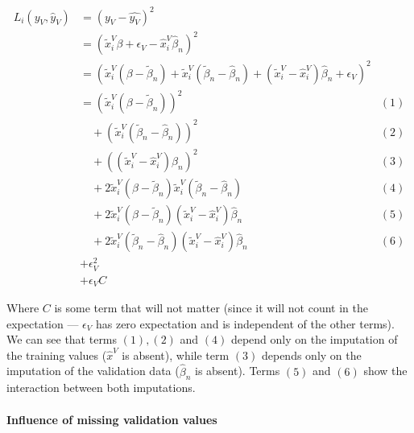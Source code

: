 \begin{align*}
L_i(y_V, \hat{y}_V) &= (y_V - \hat{y_V})^2 &\\
				&= (\tilde{x}_i^V \beta + \epsilon_V - \hat{x}_i^V \hat{\beta}_n)^2 &\\
				   &= (\tilde{x}_i^V(\beta - \tilde{\beta}_n) + \tilde{x}_i^V (\tilde{\beta}_n - \hat{\beta}_n) + (\tilde{x}_i^V - \hat{x}_i^V) \hat{\beta}_n + \epsilon_V)^2 & \\
				   &= (\tilde{x}_i^V (\beta - \tilde{\beta}_n))^2 & (1) \\
				   & \quad + (\tilde{x}_i^V (\tilde{\beta}_n-\hat{\beta}_n))^2 &(2) \\
				   & \quad + ((\tilde{x}_i^V - \hat{x}_i^V) \hat{\beta}_n)^2 &(3) \\
				   & \quad +2 \tilde{x}_i^V (\beta - \tilde{\beta}_n) \tilde{x}_i^V (\tilde{\beta}_n - \hat{\beta}_n) & (4) \\
				   & \quad +2 \tilde{x}_i^V (\beta - \tilde{\beta}_n) (\tilde{x}_i^V - \hat{x}_i^V )\hat{\beta}_n & (5) \\
				   & \quad +2 \tilde{x}_i^V (\tilde{\beta}_n - \hat{\beta}_n) (\tilde{x}_i^V - \hat{x}_i^V) \hat{\beta}_n & (6)\\
				   & + \epsilon_V^2 &\\
				   & + \epsilon_V C
\end{align*}

Where $C$ is some term that will not matter (since it will not count in the expectation --- $\epsilon_V$ has zero expectation and is independent of the other terms). We can see that terms $(1), (2)$ and $(4)$ depend only on the imputation of the training values ($\hat{x}^V$ is absent), while term $(3)$ depends only on the imputation of the validation data ($\hat{\beta}_n$ is absent). Terms $(5)$ and $(6)$ show the interaction between both imputations.

\paragraph{Influence of missing validation values}

